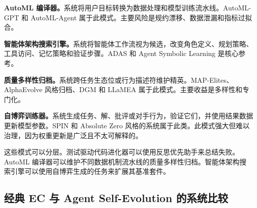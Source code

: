 \textbf{AutoML 编译器。}系统将用户目标转换为数据处理和模型训练流水线。AutoML-GPT 和 AutoML-Agent 属于此模式。主要风险是规约漂移、数据泄漏和指标过拟合。

\textbf{智能体架构搜索引擎。}系统将智能体工作流视为候选，改变角色定义、规划策略、工具访问、记忆策略和验证步骤。ADAS 和 Agent Symbolic Learning 是核心参考。

\textbf{质量多样性归档。}系统跨任务生态位或行为描述符维护精英。MAP-Elites、AlphaEvolve 风格归档、DGM 和 LLaMEA 属于此模式。主要收益是多样性和专门化。

\textbf{自博弈训练器。}系统生成任务、解、批评或对手行为，验证它们，并使用结果数据更新模型参数。SPIN 和 Absolute Zero 风格的系统属于此类。此模式强大但难以治理，因为权重更新是广泛且不太可解释的。

这些模式可以分层。测试驱动代码进化器可以使用反思优先助手来总结失败。AutoML 编译器可以维护不同数据机制流水线的质量多样性归档。智能体架构搜索引擎可以使用自博弈生成的任务来扩展其基准套件。

\subsection{经典 EC 与 Agent Self-Evolution 的系统比较}\label{sec:ch2-ec-comparison}

